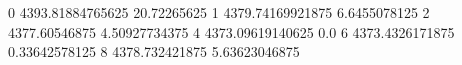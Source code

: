 0 4393.81884765625 20.72265625
1 4379.74169921875 6.6455078125
2 4377.60546875 4.50927734375
4 4373.09619140625 0.0
6 4373.4326171875 0.33642578125
8 4378.732421875 5.63623046875
